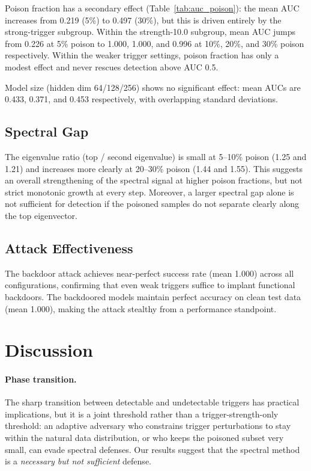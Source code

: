 \documentclass[11pt,a4paper]{article}
\begin{document}
Poison fraction has a secondary effect (Table~\ref{tab:auc_poison}): the mean AUC increases from 0.219 (5\%) to 0.497 (30\%), but this is driven entirely by the strong-trigger subgroup. Within the strength-10.0 subgroup, mean AUC jumps from 0.226 at 5\% poison to 1.000, 1.000, and 0.996 at 10\%, 20\%, and 30\% poison respectively. Within the weaker trigger settings, poison fraction has only a modest effect and never rescues detection above AUC 0.5.

Model size (hidden dim 64/128/256) shows no significant effect: mean AUCs are 0.433, 0.371, and 0.453 respectively, with overlapping standard deviations.

\subsection{Spectral Gap}

The eigenvalue ratio (top / second eigenvalue) is small at 5--10\% poison (1.25 and 1.21) and increases more clearly at 20--30\% poison (1.44 and 1.55). This suggests an overall strengthening of the spectral signal at higher poison fractions, but not strict monotonic growth at every step. Moreover, a larger spectral gap alone is not sufficient for detection if the poisoned samples do not separate clearly along the top eigenvector.

\subsection{Attack Effectiveness}

The backdoor attack achieves near-perfect success rate (mean 1.000) across all configurations, confirming that even weak triggers suffice to implant functional backdoors. The backdoored models maintain perfect accuracy on clean test data (mean 1.000), making the attack stealthy from a performance standpoint.

\section{Discussion}

\paragraph{Phase transition.} The sharp transition between detectable and undetectable triggers has practical implications, but it is a joint threshold rather than a trigger-strength-only threshold: an adaptive adversary who constrains trigger perturbations to stay within the natural data distribution, or who keeps the poisoned subset very small, can evade spectral defenses. Our results suggest that the spectral method is a \emph{necessary but not sufficient} defense.
\end{document}
